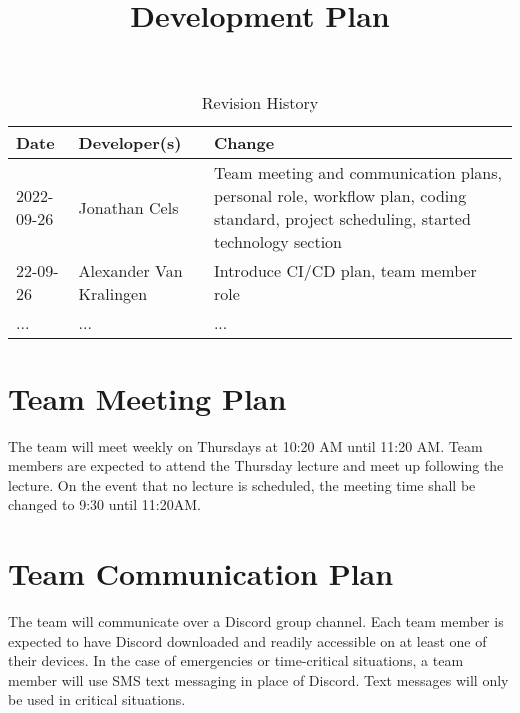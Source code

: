 \documentclass{article}
\title{Development Plan\\\progname}
\author{\authname}
\date{}
\begin{document}
\begin{table}[hp]
\caption{Revision History} \label{TblRevisionHistory}
\begin{tabularx}{\textwidth}{llX}
\toprule
\textbf{Date} & \textbf{Developer(s)} & \textbf{Change}\\
\midrule
2022-09-26 & Jonathan Cels & Team meeting and communication plans, personal role, workflow plan, coding standard, project scheduling, started technology section\\
22-09-26 & Alexander Van Kralingen & Introduce CI/CD plan, team member role\\
... & ... & ...\\
\bottomrule
\end{tabularx}
\end{table}

\newpage

\maketitle


\section{Team Meeting Plan}
{The team will meet weekly on Thursdays at 10:20 AM until 11:20 AM. 
Team members are expected to attend the Thursday lecture and meet up following the lecture. 
On the event that no lecture is scheduled, the meeting time shall be changed to 9:30 until 11:20AM.}

\medskip
{}

\section{Team Communication Plan}
{The team will communicate over a Discord group channel. Each team member is expected to have Discord downloaded and readily accessible on at least one of their devices. 
In the case of emergencies or time-critical situations, a team member will use SMS text messaging in place of Discord. Text messages will only be used in critical situations.}

\medskip
{}
\end{document}
